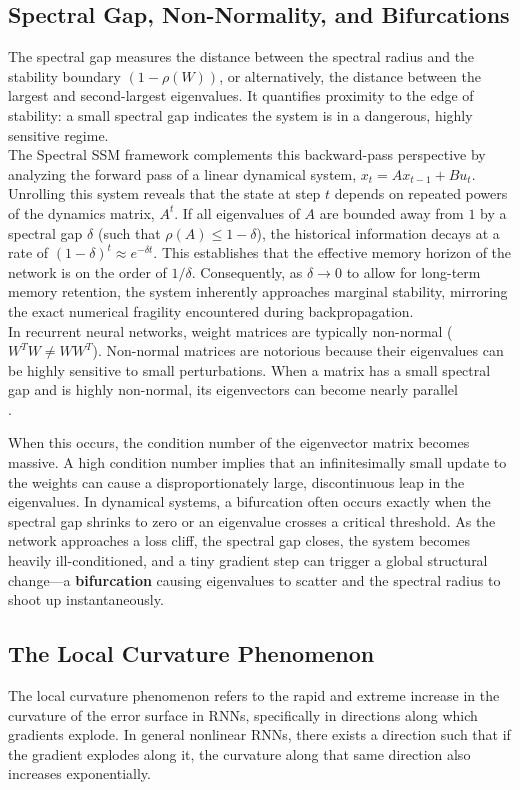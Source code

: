 \documentclass[11pt,a4paper]{article}
\begin{document}
\subsection{Spectral Gap, Non-Normality, and Bifurcations}
The spectral gap measures the distance between the spectral radius and the stability boundary $(1-\rho(W))$, or alternatively, the distance between the largest and second-largest eigenvalues. It quantifies proximity to the edge of stability: a small spectral gap indicates the system is in a dangerous, highly sensitive regime.\\
The Spectral SSM framework complements this backward-pass perspective by analyzing the forward pass of a linear dynamical system, $x_t = Ax_{t-1} + Bu_t$. Unrolling this system reveals that the state at step $t$ depends on repeated powers of the dynamics matrix, $A^t$. If all eigenvalues of $A$ are bounded away from $1$ by a spectral gap $\delta$ (such that $\rho(A) \leq 1-\delta$), the historical information decays at a rate of $(1-\delta)^t \approx e^{-\delta t}$. This establishes that the effective memory horizon of the network is on the order of $1/\delta$. Consequently, as $\delta \to 0$ to allow for long-term memory retention, the system inherently approaches marginal stability, mirroring the exact numerical fragility encountered during backpropagation.\\


In recurrent neural networks, weight matrices are typically non-normal ($W^{T}W \neq WW^{T}$). Non-normal matrices are notorious because their eigenvalues can be highly sensitive to small perturbations. When a matrix has a small spectral gap and is highly non-normal, its eigenvectors can become nearly parallel\\.

When this occurs, the condition number of the eigenvector matrix becomes massive. A high condition number implies that an infinitesimally small update to the weights can cause a disproportionately large, discontinuous leap in the eigenvalues. In dynamical systems, a bifurcation often occurs exactly when the spectral gap shrinks to zero or an eigenvalue crosses a critical threshold. As the network approaches a loss cliff, the spectral gap closes, the system becomes heavily ill-conditioned, and a tiny gradient step can trigger a global structural change---a \textbf{bifurcation} causing eigenvalues to scatter and the spectral radius to shoot up instantaneously.



\subsection{The Local Curvature Phenomenon}
The local curvature phenomenon refers to the rapid and extreme increase in the curvature of the error surface in RNNs, specifically in directions along which gradients explode. In general nonlinear RNNs, there exists a direction such that if the gradient explodes along it, the curvature along that same direction also increases exponentially.
\end{document}
